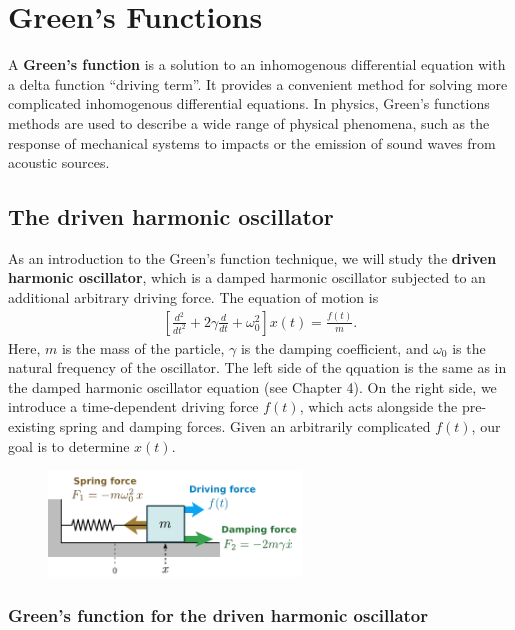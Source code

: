 \documentclass[10pt,a4paper]{article}
\begin{document}
\setcounter{page}{88}

\section{Green's Functions}
\label{greens-functions}

A \textbf{Green's function} is a solution to an inhomogenous
differential equation with a delta function ``driving term''.  It
provides a convenient method for solving more complicated inhomogenous
differential equations.  In physics, Green's functions methods are
used to describe a wide range of physical phenomena, such as the
response of mechanical systems to impacts or the emission of sound
waves from acoustic sources.

\subsection{The driven harmonic oscillator}
\label{the-driven-harmonic-oscillator}

As an introduction to the Green's function technique, we will study
the \textbf{driven harmonic oscillator}, which is a damped harmonic
oscillator subjected to an additional arbitrary driving force.  The
equation of motion is
\begin{align}
  \left[\frac{d^2}{dt^2} + 2 \gamma \frac{d}{dt} + \omega_0^2\right] x(t) = \frac{f(t)}{m}.
\end{align}
Here, $m$ is the mass of the particle, $\gamma$ is the damping
coefficient, and $\omega_0$ is the natural frequency of the
oscillator. The left side of the qquation is the same as in the damped
harmonic oscillator equation (see Chapter 4). On the right side, we
introduce a time-dependent driving force $f(t)$, which acts alongside
the pre-existing spring and damping forces. Given an arbitrarily
complicated $f(t)$, our goal is to determine $x(t)$.

\begin{figure}[ht]
  \centering\includegraphics[width=0.6\textwidth]{oscillator_driven}
\end{figure}

\subsubsection{Green's function for the driven harmonic oscillator}
\label{greens-function-for-the-driven-harmonic-oscillator}
\end{document}
